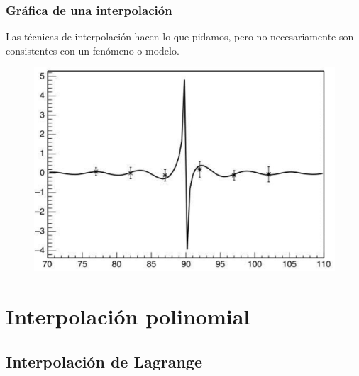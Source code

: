 \documentclass[12pt]{beamer}
\begin{document}
\begin{frame}
\frametitle{Gráfica de una interpolación}
Las técnicas de interpolación hacen lo que pidamos, pero no necesariamente son consistentes con un fenómeno o modelo.
\pause
\begin{figure}
	\centering
		\includegraphics[scale=0.4]{Imagenes/figura02.eps} 
\end{figure}
\end{frame}

\section{Interpolación polinomial}
\subsection{Interpolación de Lagrange}
\end{document}
